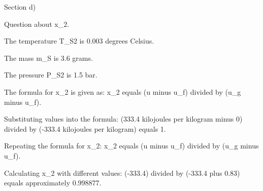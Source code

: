 Section d)

Question about x_2.

The temperature T_S2 is 0.003 degrees Celsius.

The mass m_S is 3.6 grams.

The pressure P_S2 is 1.5 bar.

The formula for x_2 is given as:
x_2 equals (u minus u_f) divided by (u_g minus u_f).

Substituting values into the formula:
(333.4 kilojoules per kilogram minus 0) divided by (-333.4 kilojoules per kilogram) equals 1.

Repeating the formula for x_2:
x_2 equals (u minus u_f) divided by (u_g minus u_f).

Calculating x_2 with different values:
(-333.4) divided by (-333.4 plus 0.83) equals approximately 0.998877.
